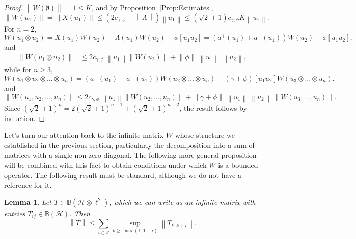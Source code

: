 \documentclass[12pt]{amsart}
\newtheorem{Lemma}[Thm]{Lemma}
\theoremstyle{definition}
\newcommand{\mf}[1]{\mathbb{#1}}
\newcommand{\mc}[1]{\mathcal{#1}}
\newcommand{\norm}[1]{\left \|{#1} \right \|}
\begin{document}
\begin{proof}
$\norm{W(\emptyset)} = 1 \leq K$, and by Proposition~\ref{Prop:Estimates},
\[
\norm{W(u_1)} = \norm{X(u_1)} \leq (2 c_{\gamma, \phi} + \norm{\Lambda}) \norm{u_1} \leq (\sqrt{2} + 1) c_{\gamma, \phi} K \norm{u_1}.
\]
For $n=2$,
	\[
	W(u_1 \otimes u_2) = X(u_1) W(u_2) - \Lambda(u_1) W(u_2) - \phi[u_1 u_2] = (a^+(u_1) + a^-(u_1)) W(u_2) - \phi[u_1 u_2],
	\]
and
	\[
\begin{split}
	\norm{W(u_1 \otimes u_2)}
& \leq 2 c_{\gamma, \phi} \ \norm{u_1} \norm{W(u_2)} + \norm{\phi} \ \norm{u_1} \ \norm{u_2},
\end{split}
	\]
while for $n \geq 3$,
	\[
	W(u_1 \otimes u_2 \otimes \ldots \otimes u_n) = (a^+(u_1) + a^-(u_1)) W(u_2 \otimes \ldots \otimes u_n) - (\gamma + \phi)[u_1 u_2] W(u_3 \otimes \ldots \otimes u_n).
	\]
and
	\[
	\norm{W(u_1, u_2, \ldots, u_n)}
	\leq 2 c_{\gamma, \phi} \ \norm{u_1} \norm{W(u_2, \ldots, u_n)} + \norm{\gamma + \phi} \ \norm{u_1} \ \norm{u_2} \ \norm{W(u_3, \ldots, u_n)}.
	\]
Since $(\sqrt{2} + 1)^n = 2 (\sqrt{2} + 1)^{n-1} + (\sqrt{2} + 1)^{n-2}$, the result follows by induction.
\end{proof}


Let's turn our attention back to the infinite matrix $W$ whose structure we established in the previous section, particularly the decomposition into a sum of matrices with a single non-zero diagonal. The following more general proposition will be combined with this fact to obtain conditions under which $W$ is a bounded operator. The following result must be standard, although we do not have a reference for it.

\begin{Lemma}
\label{Lemma:Norm-over-diagonals}
Let $T \in \mf{B} (\mc{H} \otimes \ell^2)$, which we can write as an infinite matrix with entries $T_{ij} \in \mf{B}(\mc{H})$. Then
\[
\norm{T} \leq \sum_{i \in \mf{Z}} \sup_{k \geq \max(1, 1 - i)} \norm{T_{k, k+i}}.
\]
\end{Lemma}
\end{document}
